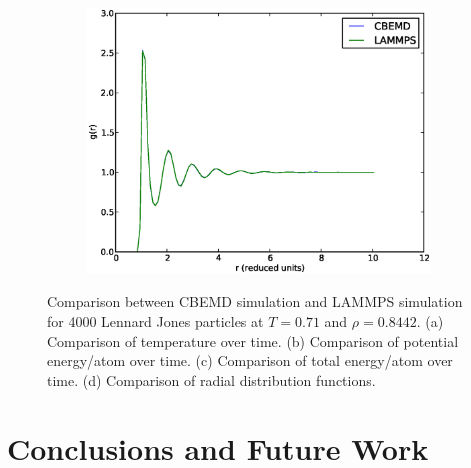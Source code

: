 \documentclass[12pt]{article}
\begin{document}
\begin{figure}[H]
\begin{subfigure}{0.5\textwidth}
	\caption{}
	\end{subfigure}
	\begin{subfigure}{0.5\textwidth}
	\includegraphics[width=\textwidth]{gr_compare}
	\caption{}
	\end{subfigure}
	\caption{Comparison between CBEMD simulation and LAMMPS simulation for 4000 Lennard Jones particles at $T=0.71$ and $\rho=0.8442$. (a) Comparison of temperature over time. (b) Comparison of potential energy/atom over time. (c) Comparison of total energy/atom over time. (d) Comparison of radial distribution functions. }
	\label{fig:lmp_compare}
\end{figure}
\section{Conclusions and Future Work}
\end{document}
